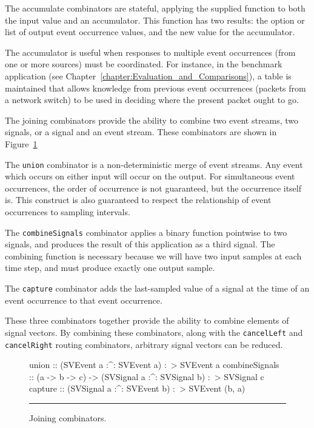 \documentclass[draft]{llncs}
\begin{document}
The accumulate combinators are stateful, applying the supplied function
to both the input value and an accumulator. This function has two results:
the option or list of output event occurrence values, and the new value
for the accumulator.

The accumulator is useful when responses to multiple event occurrences
(from one or more sources) must be coordinated. For instance, in the
benchmark application (see Chapter~\ref{chapter:Evaluation_and_Comparisons}),
a table is maintained that allows knowledge from previous event occurrences
(packets from a network switch) to be used in deciding where the present
packet ought to go.

The joining combinators provide the ability to combine two event
streams, two signals, or a signal and an event stream. These
combinators are shown in Figure~\ref{figure:joining_combinators}

The {\tt union} combinator is a non-deterministic merge of event
streams. Any event which occurs on either input will occur
on the output. For simultaneous event occurrences, the order of occurrence
is not guaranteed, but the occurrence itself is. This construct
is also guaranteed to respect the relationship of event occurrences to sampling
intervals.

The {\tt combineSignals} combinator applies a binary function pointwise to two
signals, and produces the result of this application as a third signal. The
combining function is necessary because we will have two input samples at each
time step, and must produce exactly one output sample.

The {\tt capture} combinator adds the last-sampled value of a signal at the time
of an event occurrence to that event occurrence.

These three combinators together provide the ability to combine elements of
signal vectors. By combining these combinators, along with the {\tt cancelLeft}
and {\tt cancelRight} routing combinators, arbitrary signal vectors can be
reduced.

\begin{figure}
\begin{code}
union          :: (SVEvent a :^: SVEvent a) :~> SVEvent a
combineSignals :: (a -> b -> c) -> (SVSignal a :^: SVSignal b) :~> SVSignal c
capture        :: (SVSignal a :^: SVEvent b) :~> SVEvent (b, a)
\end{code}
\hrule
\caption{Joining combinators.}
\label{figure:joining_combinators}
\end{figure}
\end{document}
